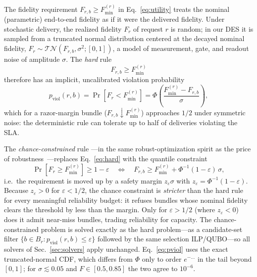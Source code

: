 \documentclass[10pt,a4paper]{article}
\begin{document}
The fidelity requirement $F_{r,b} \ge F_{\min}^{(r)}$ in
Eq.~\eqref{eq:utility} treats the nominal (parametric) end-to-end
fidelity as if it were the delivered fidelity.  Under stochastic
delivery, the realized fidelity $F_r$ of request $r$ is random; in our
DES it is sampled from a truncated normal distribution centered at the
decayed nominal fidelity,
$F_r \sim \mathcal{TN}(F_{r,b}, \sigma^2; [0,1])$, a model of
measurement, gate, and readout noise of amplitude $\sigma$.  The
\emph{hard} rule
\begin{equation}
  \label{eq:hard}
  F_{r,b} \ge F_{\min}^{(r)}
\end{equation}
therefore has an implicit, uncalibrated violation probability
\begin{equation}
  \label{eq:pviol}
  p_{\text{viol}}(r,b) = \Pr[F_r < F_{\min}^{(r)}]
    = \Phi\!\left(\frac{F_{\min}^{(r)} - F_{r,b}}{\sigma}\right),
\end{equation}
which for a razor-margin bundle ($F_{r,b} \downarrow F_{\min}^{(r)}$)
approaches $1/2$ under symmetric noise: the deterministic rule can
tolerate up to half of deliveries violating the SLA.

The \emph{chance-constrained} rule
\cite{charnes1959chance,prekopa1995stochastic,birge1997introduction,
ben-tal2009robust}---in the same robust-optimization spirit as the
price of robustness~\cite{bertsimas2004price}---replaces
Eq.~\eqref{eq:hard} with the quantile constraint
\begin{equation}
  \label{eq:chance}
  \Pr[F_r \ge F_{\min}^{(r)}] \ge 1-\varepsilon
  \quad\Longleftrightarrow\quad
  F_{r,b} \ge F_{\min}^{(r)} + \Phi^{-1}(1-\varepsilon)\, \sigma,
\end{equation}
i.e.\ the requirement is moved up by a safety margin
$z_{\varepsilon} \sigma$ with
$z_{\varepsilon} = \Phi^{-1}(1-\varepsilon)$.  Because
$z_{\varepsilon} > 0$ for $\varepsilon < 1/2$, the chance constraint is
\emph{stricter} than the hard rule for every meaningful reliability
budget: it refuses bundles whose nominal fidelity clears the threshold
by less than the margin.  Only for $\varepsilon > 1/2$ (where
$z_{\varepsilon} < 0$) does it admit near-miss bundles, trading
reliability for capacity.  The chance-constrained problem is solved
exactly as the hard problem---as a candidate-set filter
$\{b \in B_r : p_{\text{viol}}(r,b) \le \varepsilon\}$ followed by the
same selection ILP/QUBO---so all solvers of Sec.~\ref{sec:solvers}
apply unchanged.  Eq.~\eqref{eq:pviol} uses the exact truncated-normal
CDF, which differs from $\Phi$ only to order $e^{-\dots}$ in the tail
beyond $[0,1]$; for $\sigma \lesssim 0.05$ and $F \in [0.5,0.85]$ the
two agree to $10^{-6}$.
\end{document}
